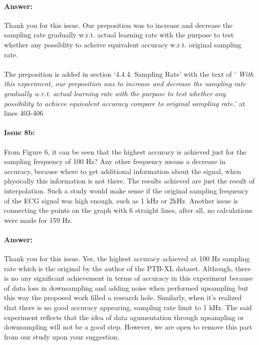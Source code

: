 \documentclass{article}
\begin{document}
\paragraph{Answer:}
Thank you for this issue. Our preposition was to increase and decrease the sampling rate gradually w.r.t. actual learning rate with the purpose to test whether any possiblity to acheive equivalent accuracy w.r.t. original sampling rate.  \\\\

The preposition is added in section `4.4.4. Sampling Rate' with the text of '\textit{ With this experiment, our preposition was to increase and decrease the sampling rate gradually w.r.t. actual learning rate with the purpose to test whether any possibility to achieve equivalent accuracy compare to original sampling rate.}' at lines 403-406

\paragraph{Issue 8b:}
\begin{displayquote}
From Figure 6, it can be seen that the highest accuracy is achieved just for the sampling frequency of 100 Hz? Any other frequency means a decrease in accuracy, because where to get additional information about the signal, when physically this information is not there. The results achieved are just the result of interpolation. Such a study would make sense if the original sampling frequency of the ECG signal was high enough, such as 1 kHz or 2kHz. Another issue is connecting the points on the graph with 6 straight lines, after all, no calculations were made for 159 Hz.
\end{displayquote}

\paragraph{Answer:}
Thank you for this issue. Yes, the highest accuracy achieved at 100 Hz sampling rate which is the original by the author of the PTB-XL dataset. Although, there is no any significant achievement in terms of accuracy in this experiment because of data loss in downsampling and adding noise when performed upsampling but this way the proposed work filled a research hole. Similarly, when it's realized that there is no good accuracy appearing, sampling rate limit to 1 kHz. The said experiment reflects that the idea of data agumentation through upsampling or downsampling will not be a good step. However, we are open to remove this part from our study upon your suggestion. 
\end{document}
